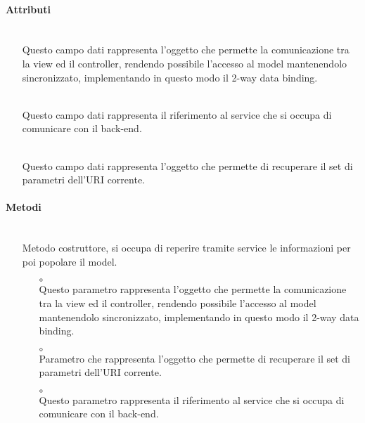 \paragraph*{Attributi}
\begin{itemize}
\item[]  \\ Questo campo dati rappresenta l'oggetto che permette la comunicazione tra la view ed il controller, rendendo possibile l’accesso al model mantenendolo sincronizzato, implementando in questo modo il 2-way data binding.
\item[]  \\ Questo campo dati rappresenta il riferimento al service che si occupa di comunicare con il back-end.
\item[]  \\ Questo campo dati rappresenta l'oggetto che permette di recuperare il set di parametri dell'URI corrente.
\end{itemize}

\paragraph*{Metodi}
\begin{itemize}
\item[]  \\ Metodo costruttore, si occupa di reperire tramite service le informazioni per poi popolare il model. 
\begin{itemize}\addtolength{\itemsep}{-0.5\baselineskip}
\item[$\circ$]  \\ Questo parametro rappresenta l'oggetto che permette la comunicazione tra la view ed il controller, rendendo possibile l’accesso al model mantenendolo sincronizzato, implementando in questo modo il 2-way data binding.
\item[$\circ$]  \\ Parametro che rappresenta l'oggetto che permette di recuperare il set di parametri dell'URI corrente.
\item[$\circ$]  \\ Questo parametro rappresenta il riferimento al service che si occupa di comunicare con il back-end.
\end{itemize}
\end{itemize}

